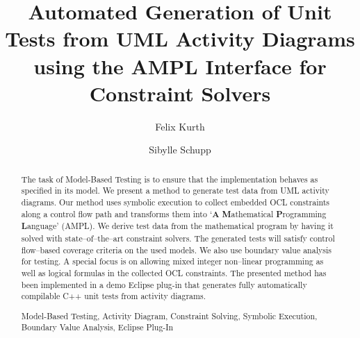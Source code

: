 \documentclass[runningheads,a4paper]{llncs}%
\newcommand{\keywords}[1]{\par\addvspace\baselineskip%
\noindent\keywordname\enspace\ignorespaces#1}%
\begin{document}
%
%
\mainmatter  %
%
\title{Automated Generation of Unit Tests from UML Activity Diagrams using the AMPL Interface for Constraint Solvers}%
%
%
%
%
%
\author{Felix Kurth%
\and Sibylle Schupp}%
%
%
%
%
%
%
%
\maketitle%
%
\begin{abstract}%
The task of Model-Based Testing is to ensure that the implementation behaves as specified in its model. We present a method to generate test data from UML activity diagrams. Our method uses symbolic execution to collect embedded OCL constraints along a control flow path and transforms them into `\textbf{A} \textbf{M}athematical \textbf{P}rogramming \textbf{L}anguage' (AMPL). We derive test data from the mathematical program by having it solved with state--of--the--art constraint solvers. The generated tests will satisfy control flow--based coverage criteria on the used models. We also use boundary value analysis for testing. A special focus is on allowing mixed integer non--linear programming as well as logical formulas in the collected OCL constraints. The presented method has been implemented in a demo Eclipse plug-in that generates fully automatically compilable C++ unit tests from activity diagrams.%
\keywords{Model-Based Testing, Activity Diagram, Constraint Solving, Symbolic Execution, Boundary Value Analysis, Eclipse Plug-In}%
\end{abstract}%
\end{document}

